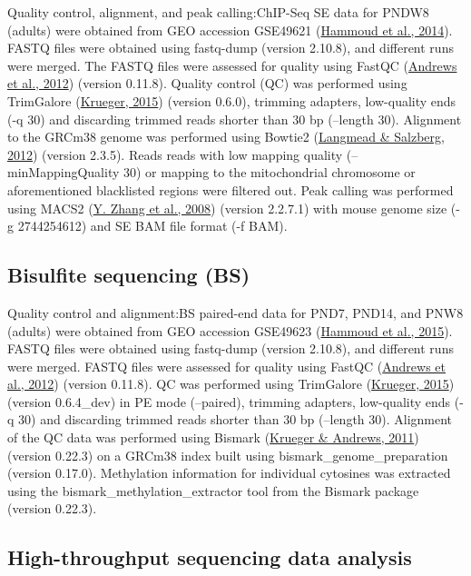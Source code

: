 \documentclass[12pt,twoside]{reedthesis}
\begin{document}
Quality control, alignment, and peak calling:ChIP-Seq SE data for PNDW8
(adults) were obtained from GEO accession GSE49621 (\protect\hyperlink{ref-hammoud2014}{Hammoud et al., 2014}). FASTQ
files were obtained using fastq-dump (version 2.10.8), and different
runs were merged. The FASTQ files were assessed for quality using FastQC
(\protect\hyperlink{ref-andrews2012}{Andrews et al., 2012}) (version 0.11.8). Quality control (QC) was performed
using TrimGalore (\protect\hyperlink{ref-krueger2015}{Krueger, 2015}) (version 0.6.0), trimming adapters,
low-quality ends (-q 30) and discarding trimmed reads shorter than 30 bp
(--length 30). Alignment to the GRCm38 genome was performed using
Bowtie2 (\protect\hyperlink{ref-langmead2012}{Langmead \& Salzberg, 2012}) (version 2.3.5). Reads reads with low mapping
quality (--minMappingQuality 30) or mapping to the mitochondrial
chromosome or aforementioned blacklisted regions were filtered out. Peak
calling was performed using MACS2 (\protect\hyperlink{ref-zhang2008}{Y. Zhang et al., 2008}) (version 2.2.7.1) with
mouse genome size (-g 2744254612) and SE BAM file format (-f BAM).

\hypertarget{bisulfite-sequencing-bs}{%
\subsection{Bisulfite sequencing (BS)}\label{bisulfite-sequencing-bs}}

Quality control and alignment:BS paired-end data for PND7, PND14, and
PNW8 (adults) were obtained from GEO accession GSE49623 (\protect\hyperlink{ref-hammoud2015}{Hammoud et al., 2015}).
FASTQ files were obtained using fastq-dump (version 2.10.8), and
different runs were merged. FASTQ files were assessed for quality using
FastQC (\protect\hyperlink{ref-andrews2012}{Andrews et al., 2012}) (version 0.11.8). QC was performed using
TrimGalore (\protect\hyperlink{ref-krueger2015}{Krueger, 2015}) (version 0.6.4\_dev) in PE mode (--paired),
trimming adapters, low-quality ends (-q 30) and discarding trimmed reads
shorter than 30 bp (--length 30). Alignment of the QC data was performed
using Bismark (\protect\hyperlink{ref-krueger2011}{Krueger \& Andrews, 2011}) (version 0.22.3) on a GRCm38 index built
using bismark\_genome\_preparation (version 0.17.0). Methylation
information for individual cytosines was extracted using the
bismark\_methylation\_extractor tool from the Bismark package (version
0.22.3).

\hypertarget{high-throughput-sequencing-data-analysis}{%
\subsection{High-throughput sequencing data analysis}\label{high-throughput-sequencing-data-analysis}}
\end{document}
